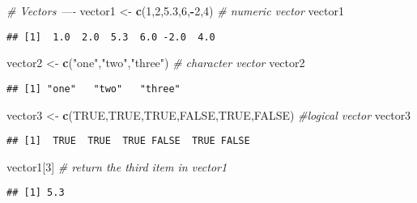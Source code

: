 \documentclass[
]{article}
\newenvironment{Shaded}{\begin{snugshade}}{\end{snugshade}}
\newcommand{\CommentTok}[1]{\textcolor[rgb]{0.56,0.35,0.01}{\textit{#1}}}
\newcommand{\DecValTok}[1]{\textcolor[rgb]{0.00,0.00,0.81}{#1}}
\newcommand{\FloatTok}[1]{\textcolor[rgb]{0.00,0.00,0.81}{#1}}
\newcommand{\KeywordTok}[1]{\textcolor[rgb]{0.13,0.29,0.53}{\textbf{#1}}}
\newcommand{\NormalTok}[1]{#1}
\newcommand{\OperatorTok}[1]{\textcolor[rgb]{0.81,0.36,0.00}{\textbf{#1}}}
\newcommand{\OtherTok}[1]{\textcolor[rgb]{0.56,0.35,0.01}{#1}}
\newcommand{\StringTok}[1]{\textcolor[rgb]{0.31,0.60,0.02}{#1}}
\begin{document}
\begin{Shaded}
\begin{Highlighting}[]
\CommentTok{# Vectors ----}
\NormalTok{vector1 <-}\StringTok{ }\KeywordTok{c}\NormalTok{(}\DecValTok{1}\NormalTok{,}\DecValTok{2}\NormalTok{,}\FloatTok{5.3}\NormalTok{,}\DecValTok{6}\NormalTok{,}\OperatorTok{-}\DecValTok{2}\NormalTok{,}\DecValTok{4}\NormalTok{) }\CommentTok{# numeric vector}
\NormalTok{vector1}
\end{Highlighting}
\end{Shaded}

\begin{verbatim}
## [1]  1.0  2.0  5.3  6.0 -2.0  4.0
\end{verbatim}

\begin{Shaded}
\begin{Highlighting}[]
\NormalTok{vector2 <-}\StringTok{ }\KeywordTok{c}\NormalTok{(}\StringTok{"one"}\NormalTok{,}\StringTok{"two"}\NormalTok{,}\StringTok{"three"}\NormalTok{) }\CommentTok{# character vector}
\NormalTok{vector2}
\end{Highlighting}
\end{Shaded}

\begin{verbatim}
## [1] "one"   "two"   "three"
\end{verbatim}

\begin{Shaded}
\begin{Highlighting}[]
\NormalTok{vector3 <-}\StringTok{ }\KeywordTok{c}\NormalTok{(}\OtherTok{TRUE}\NormalTok{,}\OtherTok{TRUE}\NormalTok{,}\OtherTok{TRUE}\NormalTok{,}\OtherTok{FALSE}\NormalTok{,}\OtherTok{TRUE}\NormalTok{,}\OtherTok{FALSE}\NormalTok{) }\CommentTok{#logical vector}
\NormalTok{vector3}
\end{Highlighting}
\end{Shaded}

\begin{verbatim}
## [1]  TRUE  TRUE  TRUE FALSE  TRUE FALSE
\end{verbatim}

\begin{Shaded}
\begin{Highlighting}[]
\NormalTok{vector1[}\DecValTok{3}\NormalTok{] }\CommentTok{# return the third item in vector1}
\end{Highlighting}
\end{Shaded}

\begin{verbatim}
## [1] 5.3
\end{verbatim}
\end{document}
